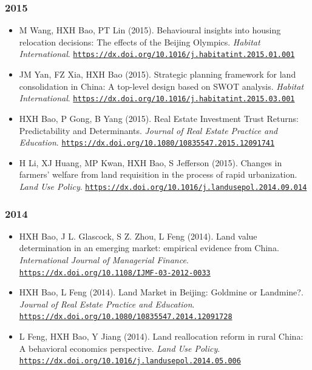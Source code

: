 \documentclass[11pt,a4paper]{article}
\providecommand{\tightlist}{%
  \setlength{\itemsep}{1pt}\setlength{\parskip}{0pt}}
\begin{document}
\subsubsection{2015}\label{section-11}

\begin{itemize}
\tightlist
\item
  M Wang, HXH Bao, PT Lin (2015). Behavioural insights into housing
  relocation decisions: The effects of the Beijing Olympics.
  \emph{Habitat International}.
  \href{https://dx.doi.org/10.1016/j.habitatint.2015.01.001}{\nolinkurl{https://dx.doi.org/10.1016/j.habitatint.2015.01.001}}
\item
  JM Yan, FZ Xia, HXH Bao (2015). Strategic planning framework for land
  consolidation in China: A top-level design based on SWOT analysis.
  \emph{Habitat International}.
  \href{https://dx.doi.org/10.1016/j.habitatint.2015.03.001}{\nolinkurl{https://dx.doi.org/10.1016/j.habitatint.2015.03.001}}
\item
  HXH Bao, P Gong, B Yang (2015). Real Estate Investment Trust Returns:
  Predictability and Determinants. \emph{Journal of Real Estate Practice
  and Education}.
  \href{https://dx.doi.org/10.1080/10835547.2015.12091741}{\nolinkurl{https://dx.doi.org/10.1080/10835547.2015.12091741}}
\item
  H Li, XJ Huang, MP Kwan, HXH Bao, S Jefferson (2015). Changes in
  farmers' welfare from land requisition in the process of rapid
  urbanization. \emph{Land Use Policy}.
  \href{https://dx.doi.org/10.1016/j.landusepol.2014.09.014}{\nolinkurl{https://dx.doi.org/10.1016/j.landusepol.2014.09.014}}
\end{itemize}

\subsubsection{2014}\label{section-12}

\begin{itemize}
\tightlist
\item
  HXH Bao, J L. Glascock, S Z. Zhou, L Feng (2014). Land value
  determination in an emerging market: empirical evidence from China.
  \emph{International Journal of Managerial Finance}.
  \href{https://dx.doi.org/10.1108/IJMF-03-2012-0033}{\nolinkurl{https://dx.doi.org/10.1108/IJMF-03-2012-0033}}
\item
  HXH Bao, L Feng (2014). Land Market in Beijing: Goldmine or Landmine?.
  \emph{Journal of Real Estate Practice and Education}.
  \href{https://dx.doi.org/10.1080/10835547.2014.12091728}{\nolinkurl{https://dx.doi.org/10.1080/10835547.2014.12091728}}
\item
  L Feng, HXH Bao, Y Jiang (2014). Land reallocation reform in rural
  China: A behavioral economics perspective. \emph{Land Use Policy}.
  \href{https://dx.doi.org/10.1016/j.landusepol.2014.05.006}{\nolinkurl{https://dx.doi.org/10.1016/j.landusepol.2014.05.006}}
\end{itemize}
\end{document}
